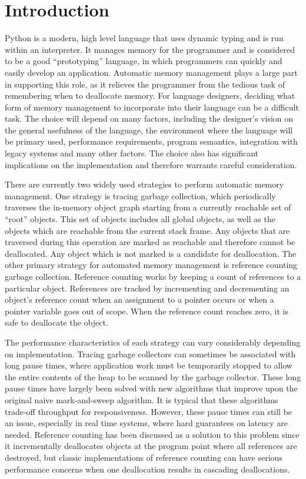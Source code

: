 \documentclass{sigplanconf}
\begin{document}
\section{Introduction}

Python is a modern, high level language that uses dynamic typing and is run within an interpreter.  It manages memory for the programmer and is considered to be a good ``prototyping'' language, in which programmers can quickly and easily develop an application.   Automatic memory management plays a large part in supporting this role, as it relieves the programmer from the tedious task of remembering when to deallocate memory.  For language designers, deciding what form of memory management to incorporate into their language can be a difficult task.  The choice will depend on many factors, including the designer's vision on the general usefulness of the language, the environment where the language will be primary used, performance requirements, program semantics, integration with legacy systems and many other factors.  The choice also has significant implications on the implementation and therefore warrants careful consideration.  

There are currently two widely used strategies to perform automatic memory management.  One strategy is tracing garbage collection, which periodically traverses the in-memory object graph starting from a currently reachable set of ``root'' objects.  This set of objects includes all global objects, as well as the objects which are reachable from the current stack frame.  Any objects that are traversed during this operation are marked as reachable and therefore cannot be deallocated.  Any object which is not marked is a candidate for deallocation.  The other primary strategy for automated memory management is reference counting garbage collection. Reference counting works by keeping a count of references to a particular object.  References are tracked by incrementing and decrementing an object's reference count when an assignment to a pointer occurs or when a pointer variable goes out of scope.  When the reference count reaches zero, it is safe to deallocate the object.

The performance characteristics of each strategy can vary considerably depending on implementation.   Tracing garbage collectors can sometimes be associated with long pause times, where application work must be temporarily stopped to allow the entire contents of the heap to be scanned by the garbage collector.  These long pause times have largely been solved with new algorithms that improve upon the original naive mark-and-sweep algorithm.  It is typical that these algorithms trade-off throughput for responsiveness.  However, these pause times can still be an issue, especially in real time systems, where hard guarantees on latency are needed.  Reference counting has been discussed as a solution to this problem since it incrementally deallocates objects at the program point where all references are destroyed, but classic implementations of reference counting can have serious performance concerns when one deallocation results in cascading deallocations\cite{boehm}.  
\end{document}
